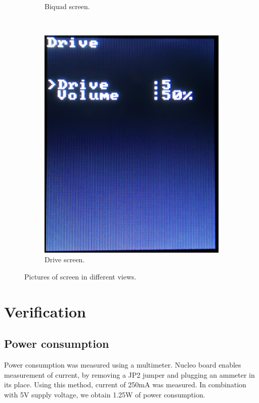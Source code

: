 \documentclass[a4paper,twoside,12pt]{book}
\begin{document}
\begin{figure}[H]
\begin{subfigure}[t]{0.23\textwidth}
        \caption{Biquad screen.}
    \end{subfigure}
    ~
    \begin{subfigure}[t]{0.23\textwidth}
        \includegraphics[width=\textwidth]{images/screen4}
        \caption{Drive screen.}
    \end{subfigure}
    \caption{Pictures of screen in different views.}
    \label{fig:screens}
\end{figure}

\chapter{Verification}\label{ch:verification}
\section{Power consumption}
Power consumption was measured using a multimeter.
Nucleo board enables measurement of current,
by removing a JP2 jumper and plugging an ammeter in its place\cite{ST:UM2407}.
Using this method, current of 250mA was measured.
In combination with 5V supply voltage,
we obtain 1.25W of power consumption.
\end{document}

